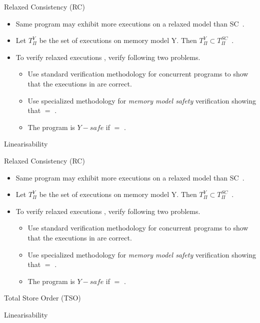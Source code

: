 \documentclass[9pt]{beamer}
\begin{document}
\begin{frame}{Relaxed Consistency (RC)}
\begin{itemize}
\item Same program may exhibit more executions on
      a relaxed model than SC~\cite{Burckhardt2008}.
\item Let $T_{\Pi}^Y$ be the set of executions on memory model Y.
        Then $T_{\Pi}^Y \subset T_{\Pi}^{SC}$~\cite{Burckhardt2008}.
\item To verify relaxed executions \rlxset{}, verify following two problems.
  \begin{itemize}
  \item Use standard verification methodology for concurrent programs to show that
        the executions in \scset{} are correct.
  \item Use specialized methodology for {\em memory model safety} verification
        showing that \rlxset{} $=$ \scset{}.
  \item The program is $Y-safe$  if \rlxset{} $=$ \scset{}.
  \end{itemize}
\end{itemize}
\end{frame}

\begin{frame}{Linearisability}
\end{frame}




\begin{frame}{Relaxed Consistency (RC)}
\begin{itemize}
\item Same program may exhibit more executions on
      a relaxed model than SC~\cite{Burckhardt2008}.
  \item Let $T_{\Pi}^Y$ be the set of executions on memory model Y.
        Then $T_{\Pi}^Y \subset T_{\Pi}^{SC}$~\cite{Burckhardt2008}.
  \item To verify relaxed executions \rlxset{}, verify following two problems.
  \begin{itemize}
  \item Use standard verification methodology for concurrent programs to show that
        the executions in \scset{} are correct.
  \item Use specialized methodology for {\em memory model safety} verification
        showing that \rlxset{} $=$ \scset{}.
  \item The program is $Y-safe$  if \rlxset{} $=$ \scset{}.
  \end{itemize}
\end{itemize}
\end{frame}
\begin{frame}{Total Store Order (TSO)}

\end{frame}
\begin{frame}{Linearisability}
\end{frame}




\footnotesize{


}
\end{document}
